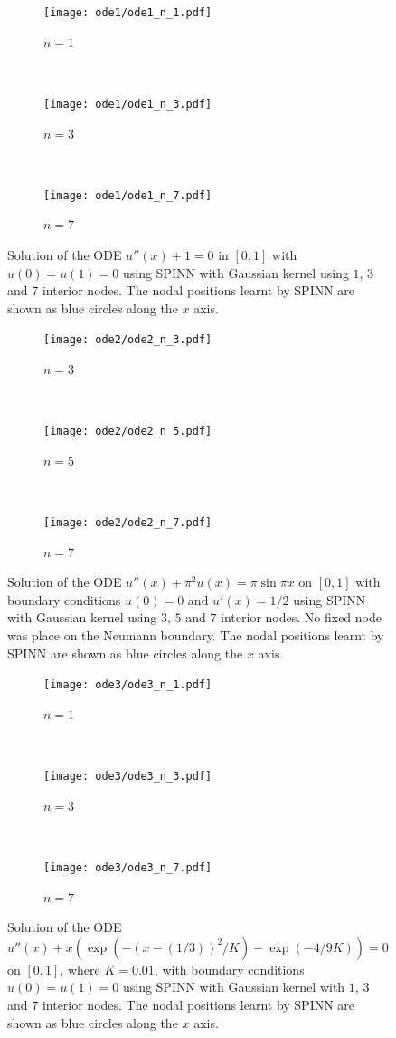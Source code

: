 \documentclass[12pt]{article}
\begin{document}
\begin{figure}
\centering
\begin{subfigure}{0.3\textwidth}
\texttt{[image: ode1/ode1\_n\_1.pdf]}
\caption{$n = 1$}
\label{fig:ode1_n_1}
\end{subfigure}
~
\begin{subfigure}{0.3\textwidth}
\texttt{[image: ode1/ode1\_n\_3.pdf]}
\caption{$n = 3$}
\label{fig:ode1_n_3}
\end{subfigure}
~
\begin{subfigure}{0.3\textwidth}
\texttt{[image: ode1/ode1\_n\_7.pdf]}
\caption{$n = 7$}
\label{fig:ode1_n_7}
\end{subfigure}
\caption{Solution of the ODE $u''(x) + 1 = 0$ in $[0,1]$ with $u(0) = u(1) = 0$ using SPINN with Gaussian kernel using $1$, $3$ and $7$ interior nodes. The nodal positions learnt by SPINN are shown as blue circles along the $x$ axis.}
\label{fig:spinn_ode_1}
\end{figure}

\begin{figure}
\centering
\begin{subfigure}{0.3\textwidth}
\texttt{[image: ode2/ode2\_n\_3.pdf]}
\caption{$n = 3$}
\label{fig:ode2_n_3}
\end{subfigure}
~
\begin{subfigure}{0.3\textwidth}
\texttt{[image: ode2/ode2\_n\_5.pdf]}
\caption{$n = 5$}
\label{fig:ode2_n_5}
\end{subfigure}
~
\begin{subfigure}{0.3\textwidth}
\texttt{[image: ode2/ode2\_n\_7.pdf]}
\caption{$n = 7$}
\label{fig:ode2_n_7}
\end{subfigure}
\caption{Solution of the ODE $u''(x) + \pi^2 u(x) = \pi \sin \pi x$ on $[0,1]$ with boundary conditions $u(0) = 0$ and $u'(x) = 1/2$ using SPINN with Gaussian kernel using $3$, $5$ and $7$ interior nodes. No fixed node was place on the Neumann boundary. The nodal positions learnt by SPINN are shown as blue circles along the $x$ axis.}
\label{fig:spinn_ode_2_A}
\end{figure}

\begin{figure}
\centering
\begin{subfigure}{0.3\textwidth}
\texttt{[image: ode3/ode3\_n\_1.pdf]}
\caption{$n = 1$}
\label{fig:ode3_n_1}
\end{subfigure}
~
\begin{subfigure}{0.3\textwidth}
\texttt{[image: ode3/ode3\_n\_3.pdf]}
\caption{$n = 3$}
\label{fig:ode3_n_3}
\end{subfigure}
~
\begin{subfigure}{0.3\textwidth}
\texttt{[image: ode3/ode3\_n\_7.pdf]}
\caption{$n = 7$}
\label{fig:ode3_n_7}
\end{subfigure}
\caption{Solution of the ODE $u''(x) + x(\exp (-(x - (1/3))^2/K) - \exp (-4/9K)) = 0$ on $[0,1]$, where $K = 0.01$, with boundary conditions $u(0) = u(1) = 0$ using SPINN with Gaussian kernel with $1$, $3$ and $7$ interior nodes. The nodal positions learnt by SPINN are shown as blue circles along the $x$ axis.}
\label{fig:spinn_ode_3_A}
\end{figure}
\end{document}
